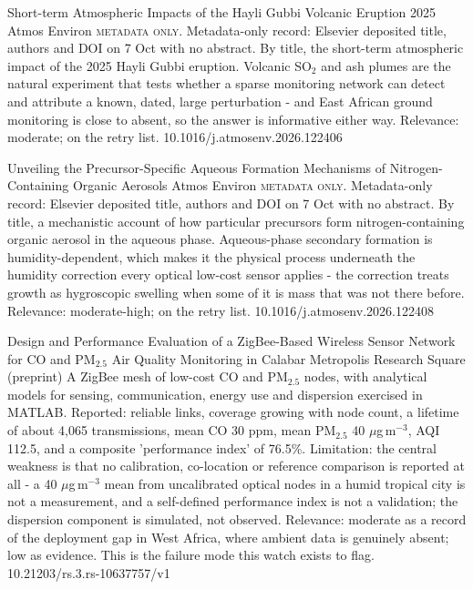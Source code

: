 \documentclass[10pt]{article}
\begin{document}
{Short-term Atmospheric Impacts of the Hayli Gubbi Volcanic Eruption 2025}
{Atmos Environ}
{\textsc{metadata only.} Metadata-only record: Elsevier deposited title, authors and DOI on 7 Oct with no abstract. By title, the short-term atmospheric impact of the 2025 Hayli Gubbi eruption. Volcanic SO$_2$ and ash plumes are the natural experiment that tests whether a sparse monitoring network can detect and attribute a known, dated, large perturbation - and East African ground monitoring is close to absent, so the answer is informative either way. Relevance: moderate; on the retry list.}
{10.1016/j.atmosenv.2026.122406}

{Unveiling the Precursor-Specific Aqueous Formation Mechanisms of Nitrogen-Containing Organic Aerosols}
{Atmos Environ}
{\textsc{metadata only.} Metadata-only record: Elsevier deposited title, authors and DOI on 7 Oct with no abstract. By title, a mechanistic account of how particular precursors form nitrogen-containing organic aerosol in the aqueous phase. Aqueous-phase secondary formation is humidity-dependent, which makes it the physical process underneath the humidity correction every optical low-cost sensor applies - the correction treats growth as hygroscopic swelling when some of it is mass that was not there before. Relevance: moderate-high; on the retry list.}
{10.1016/j.atmosenv.2026.122408}

\par{}\baselineskip{}\baselineskip
{}

{Design and Performance Evaluation of a ZigBee-Based Wireless Sensor Network for CO and PM$_{2.5}$ Air Quality Monitoring in Calabar Metropolis}
{Research Square (preprint)}
{A ZigBee mesh of low-cost CO and PM$_{2.5}$ nodes, with analytical models for sensing, communication, energy use and dispersion exercised in MATLAB. Reported: reliable links, coverage growing with node count, a lifetime of about 4,065 transmissions, mean CO 30 ppm, mean PM$_{2.5}$ 40 $\mu$g\,m$^{-3}$, AQI 112.5, and a composite 'performance index' of 76.5\%. Limitation: the central weakness is that no calibration, co-location or reference comparison is reported at all - a 40 $\mu$g\,m$^{-3}$ mean from uncalibrated optical nodes in a humid tropical city is not a measurement, and a self-defined performance index is not a validation; the dispersion component is simulated, not observed. Relevance: moderate as a record of the deployment gap in West Africa, where ambient data is genuinely absent; low as evidence. This is the failure mode this watch exists to flag.}
{10.21203/rs.3.rs-10637757/v1}
\end{document}
